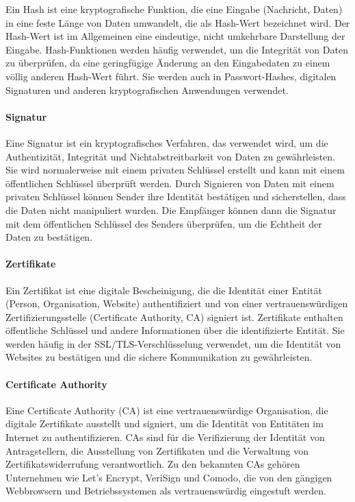 Ein Hash ist eine kryptografische Funktion, die eine Eingabe (Nachricht, Daten) in eine feste Länge von Daten umwandelt, die als Hash-Wert bezeichnet wird. Der Hash-Wert ist im Allgemeinen eine eindeutige, nicht umkehrbare Darstellung der Eingabe. Hash-Funktionen werden häufig verwendet, um die Integrität von Daten zu überprüfen, da eine geringfügige Änderung an den Eingabedaten zu einem völlig anderen Hash-Wert führt. Sie werden auch in Passwort-Hashes, digitalen Signaturen und anderen kryptografischen Anwendungen verwendet.

\paragraph{Signatur}

Eine Signatur ist ein kryptografisches Verfahren, das verwendet wird, um die Authentizität, Integrität und Nichtabstreitbarkeit von Daten zu gewährleisten. Sie wird normalerweise mit einem privaten Schlüssel erstellt und kann mit einem öffentlichen Schlüssel überprüft werden. Durch Signieren von Daten mit einem privaten Schlüssel können Sender ihre Identität bestätigen und sicherstellen, dass die Daten nicht manipuliert wurden. Die Empfänger können dann die Signatur mit dem öffentlichen Schlüssel des Senders überprüfen, um die Echtheit der Daten zu bestätigen.

\paragraph{Zertifikate}

Ein Zertifikat ist eine digitale Bescheinigung, die die Identität einer Entität (Person, Organisation, Website) authentifiziert und von einer vertrauenswürdigen Zertifizierungsstelle (Certificate Authority, CA) signiert ist. Zertifikate enthalten öffentliche Schlüssel und andere Informationen über die identifizierte Entität. Sie werden häufig in der SSL/TLS-Verschlüsselung verwendet, um die Identität von Websites zu bestätigen und die sichere Kommunikation zu gewährleisten.

\paragraph{Certificate Authority}

Eine Certificate Authority (CA) ist eine vertrauenswürdige Organisation, die digitale Zertifikate ausstellt und signiert, um die Identität von Entitäten im Internet zu authentifizieren. CAs sind für die Verifizierung der Identität von Antragstellern, die Ausstellung von Zertifikaten und die Verwaltung von Zertifikatswiderrufung verantwortlich. Zu den bekannten CAs gehören Unternehmen wie Let's Encrypt, VeriSign und Comodo, die von den gängigen Webbrowsern und Betriebssystemen als vertrauenswürdig eingestuft werden.



\clearpage